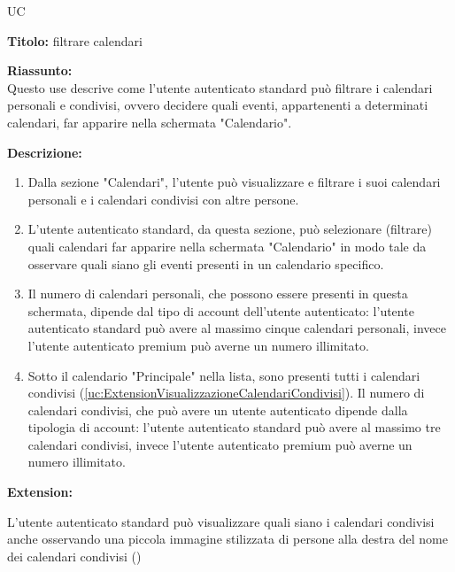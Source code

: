 \begin{listaPersonale}{UC}

    \begin{center}
        
    \end{center}

    \textbf{Titolo:} filtrare calendari

    \textbf{Riassunto:} \\
    Questo use descrive come l'utente autenticato standard può filtrare i calendari personali e condivisi, ovvero decidere  quali eventi, appartenenti a determinati calendari, far apparire nella schermata "Calendario".

    \textbf{Descrizione:}
    \begin{enumerate}
        \item Dalla sezione "Calendari", l'utente può visualizzare e filtrare i suoi calendari personali e i calendari condivisi con altre persone.
        \item L'utente autenticato standard, da questa sezione, può selezionare (filtrare) quali calendari far apparire nella schermata "Calendario" in modo tale da osservare quali siano gli eventi presenti in un calendario specifico.
        \item Il numero di calendari personali, che possono essere presenti in questa schermata, dipende dal tipo di account dell'utente autenticato: l'utente autenticato standard può avere al massimo cinque calendari personali, invece l'utente autenticato premium può averne un numero illimitato.
        \item Sotto il calendario "Principale" nella lista, sono presenti tutti i calendari condivisi (\ref{uc:ExtensionVisualizzazioneCalendariCondivisi}). Il numero di calendari condivisi, che può avere un utente autenticato dipende dalla tipologia di account: l'utente autenticato standard può avere al massimo tre calendari condivisi, invece l'utente autenticato premium può averne un numero illimitato.
    \end{enumerate}


    \textbf{Extension:}
    \begin{enumerate}[label=\textbf{[extension \arabic{enumii}]}, ref= \textbf{[extension \arabic{enumii}]}]
         L'utente autenticato standard può visualizzare quali siano i calendari condivisi anche osservando una piccola immagine stilizzata di persone alla destra del nome dei calendari condivisi ()
    \end{enumerate}



\end{listaPersonale}
